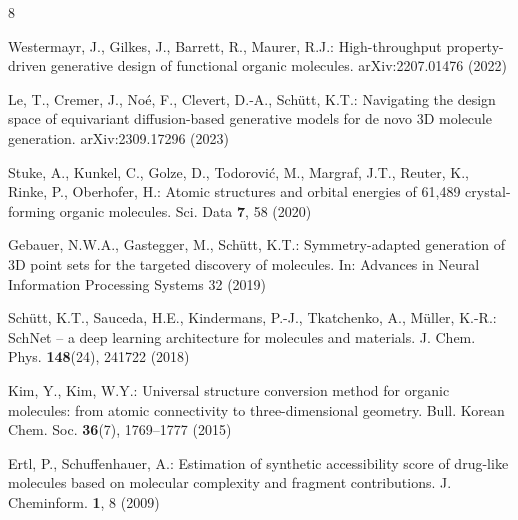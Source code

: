 \documentclass[runningheads]{llncs}
\begin{document}
\begin{thebibliography}{8}

Westermayr, J., Gilkes, J., Barrett, R., Maurer, R.J.: High-throughput
property-driven generative design of functional organic molecules.
arXiv:2207.01476 (2022)

Le, T., Cremer, J., No\'e, F., Clevert, D.-A., Sch\"utt, K.T.:
Navigating the design space of equivariant diffusion-based generative
models for de novo 3D molecule generation. arXiv:2309.17296 (2023)

Stuke, A., Kunkel, C., Golze, D., Todorovi\'c, M., Margraf, J.T.,
Reuter, K., Rinke, P., Oberhofer, H.: Atomic structures and orbital
energies of 61,489 crystal-forming organic molecules. Sci. Data
\textbf{7}, 58 (2020)

Gebauer, N.W.A., Gastegger, M., Sch\"utt, K.T.: Symmetry-adapted
generation of 3D point sets for the targeted discovery of molecules.
In: Advances in Neural Information Processing Systems 32 (2019)

Sch\"utt, K.T., Sauceda, H.E., Kindermans, P.-J., Tkatchenko, A.,
M\"uller, K.-R.: SchNet -- a deep learning architecture for molecules
and materials. J. Chem. Phys. \textbf{148}(24), 241722 (2018)

Kim, Y., Kim, W.Y.: Universal structure conversion method for organic
molecules: from atomic connectivity to three-dimensional geometry.
Bull. Korean Chem. Soc. \textbf{36}(7), 1769--1777 (2015)

Ertl, P., Schuffenhauer, A.: Estimation of synthetic accessibility
score of drug-like molecules based on molecular complexity and fragment
contributions. J. Cheminform. \textbf{1}, 8 (2009)

\end{thebibliography}
\end{document}
